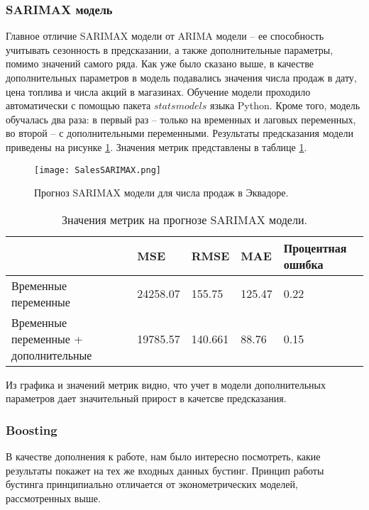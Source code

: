 \documentclass[]{article}
\begin{document}
\subsubsection{SARIMAX модель}

Главное отличие SARIMAX модели от ARIMA модели -- ее способность учитывать сезонность в предсказании, а также дополнительные параметры, помимо значений самого ряда. Как уже было сказано выше, в качестве дополнительных параметров в модель подавались значения числа продаж в дату, цена топлива и числа акций в магазинах. Обучение модели проходило автоматически с помощью пакета $statsmodels$ языка Python. Кроме того, модель обучалась два раза: в первый раз -- только на временных и лаговых переменных, во второй -- с дополнительными переменными.
Результаты предсказания модели приведены на рисунке \ref{fig:sarimax}. Значения метрик представлены в таблице  \ref{tab:sarimax}.

\begin{figure}[h!]
	\centering
	\texttt{[image: SalesSARIMAX.png]}
	\caption{Прогноз SARIMAX модели для числа продаж в Эквадоре.}
	\label{fig:sarimax}
\end{figure}

\begin{table}[h!]
	\centering
	\caption{Значения метрик на прогнозе SARIMAX модели.}
	\begin{tabularx}{\textwidth}{|X|l|l|l|l|}
		\hline
		& MSE          & RMSE   & MAE   & Процентная ошибка \\ \hline
		{Временные переменные}                  & 24258.07 & 155.75 & 125.47 & 0.22\\ \hline
		{Временные переменные + дополнительные} & 19785.57 & 140.661   & 88.76 & 0.15 \\ \hline
	\end{tabularx}
	\label{tab:sarimax}
\end{table}

Из графика и значений метрик видно, что учет в модели дополнительных параметров дает значительный прирост в качетсве предсказания.


\subsubsection{Boosting}

В качестве дополнения к работе, нам было интересно посмотреть, какие результаты покажет на тех же входных данных бустинг. Принцип работы бустинга принципиально отличается от эконометрических моделей, рассмотренных выше. 
\end{document}
